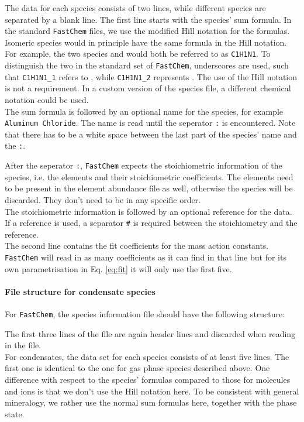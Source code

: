 \documentclass[numbers=noenddot]{aux/fcmanual}
\let\ce\ch
\newcommand{\fc}{\texttt{FastChem}\xspace}
\begin{document}
The data for each species consists of two lines, while different species are separated by a blank line.
The first line starts with the species' sum formula. In the standard \fc files, we use the modified Hill notation for the formulas. Isomeric species would in principle have the same formula in the Hill notation. For example, the two species \ce{HCN} and \ce{HNC} would both be referred to as \texttt{C1H1N1}. To distinguish the two in the standard set of \fc, underscores are used, such that \texttt{C1H1N1\_1} refers to \ce{HCN}, while \texttt{C1H1N1\_2} represents \ce{HNC}.
The use of the Hill notation is not a requirement. In a custom version of the species file, a different chemical notation could be used.\\

The sum formula is followed by an optional name for the species, for example \verb|Aluminum Chloride|. The name is read until the seperator \verb|:| is encountered. Note that there has to be a white space between the last part of the species' name and the \verb|:|.

After the seperator \verb|:|, \fc expects the stoichiometric information of the species, i.e. the elements and their stoichiometric coefficients. The elements need to be present in the element abundance file as well, otherwise the species will be discarded. They don't need to be in any specific order.\\
The stoichiometric information is followed by an optional reference for the data. If a reference is used, a separator \verb|#| is required between the stoichiometry and the reference.\\

The second line contains the fit coefficients for the mass action constants. \fc will read in as many coefficients as it can find in that line but for its own parametrisation in Eq. \eqref{eq:fit} it will only use the first five.


\paragraph{File structure for condensate species}
For \fc, the species information file should have the following structure:

The first three lines of the file are again header lines and discarded when reading in the file. \\

For condensates, the data set for each species consists of at least five lines. The first one is identical to the one for gas phase species described above. One difference with respect to the species' formulas compared to those for molecules and ions is that we don't use the Hill notation here. To be consistent with general mineralogy, we rather use the normal sum formulas here, together with the phase state. 
\end{document}
